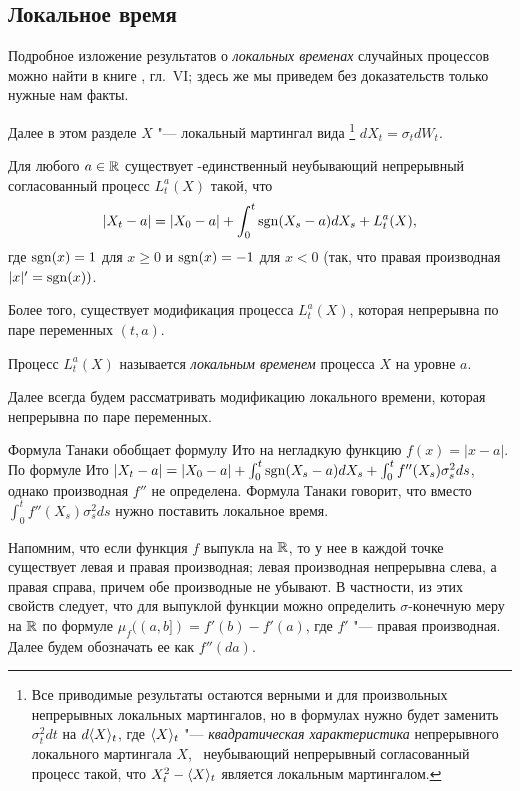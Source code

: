 \subsection{Локальное время}

Подробное изложение результатов о \emph{локальных временах} случайных процессов можно найти в книге \cite{RevuzYor}, гл.~VI; здесь же мы приведем без доказательств только нужные нам факты.

Далее в этом разделе $X$ "--- локальный мартингал вида%
\footnote{Все приводимые результаты остаются верными и для произвольных непрерывных локальных мартингалов, но в формулах нужно будет заменить $\sigma_t^2 dt$ на $d\langle X \rangle_t$, где $\langle X \rangle_t$ "--- \emph{квадратическая характеристика} непрерывного локального мартингала $X$, \te\  неубывающий непрерывный согласованный процесс такой, что $X_t^2 - \langle X \rangle_t$ является локальным мартингалом.}
$d X_t = \sigma_t d W_t$.

\begin{proposition}
Для любого $a\in \mathbb{R}$ существует \as-единственный неубывающий непрерывный согласованный процесс $L_t^a(X)$ такой, что 
\[
|X_t - a| = |X_0-a| + \int_0^t \operatorname{sgn}(X_s-a) d X_s + L_t^a(X),
\]
где $\operatorname{sgn}(x) = 1$ для $x\ge 0$ и $\operatorname{sgn}(x)=-1$ для $x< 0$ (так, что правая производная $|x|' = \operatorname{sgn}(x))$.

Более того, существует модификация процесса $L_t^a(X)$, которая непрерывна по паре переменных $(t,a)$.
\end{proposition}

\begin{definition}
Процесс $L_t^a(X)$ называется \emph{локальным временем} процесса $X$ на уровне $a$.
\end{definition}

Далее всегда будем рассматривать модификацию локального времени, которая непрерывна по паре переменных.

\begin{remark}
Формула Танаки обобщает формулу Ито на негладкую функцию $f(x) = |x-a|$. 
По формуле Ито $|X_t - a| = |X_0-a| + \int_0^t \operatorname{sgn}(X_s-a) d X_s + \int_0^t f''(X_s) \sigma_s^2 ds$, однако производная $f''$ не определена.
Формула Танаки говорит, что вместо $\int_0^t f''(X_s) \sigma_s^2 ds$ нужно поставить локальное время.
\end{remark}


\medskip
Напомним, что если функция $f$ выпукла на $\mathbb{R}$, то у нее в каждой точке существует левая и правая производная; левая производная непрерывна слева, а правая справа, причем обе производные не убывают.
В частности, из этих свойств следует, что для выпуклой функции можно определить $\sigma$-конечную меру на $\mathbb{R}$ по формуле $\mu_f((a,b]) = f'(b) - f'(a)$, где $f'$ "--- правая производная.
Далее будем обозначать ее как $f''(da)$.

